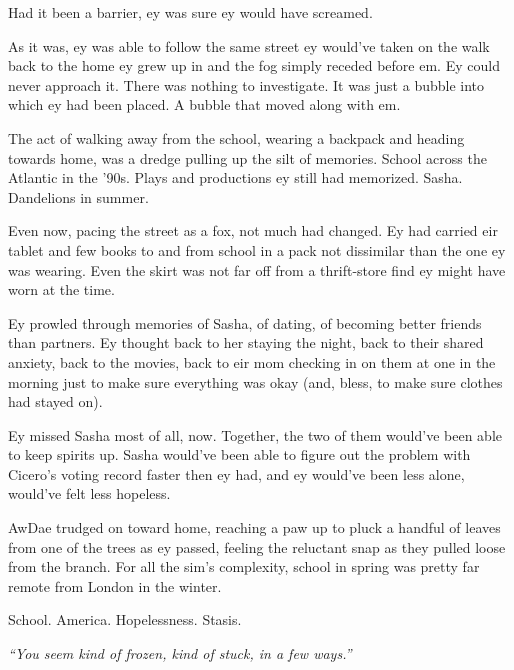 Had it been a barrier, ey was sure ey would have screamed.

As it was, ey was able to follow the same street ey would've taken on the walk back to the home ey grew up in and the fog simply receded before em. Ey could never approach it. There was nothing to investigate. It was just a bubble into which ey had been placed. A bubble that moved along with em.

The act of walking away from the school, wearing a backpack and heading towards home, was a dredge pulling up the silt of memories. School across the Atlantic in the '90s. Plays and productions ey still had memorized. Sasha. Dandelions in summer.

Even now, pacing the street as a fox, not much had changed. Ey had carried eir tablet and few books to and from school in a pack not dissimilar than the one ey was wearing. Even the skirt was not far off from a thrift-store find ey might have worn at the time.

Ey prowled through memories of Sasha, of dating, of becoming better friends than partners. Ey thought back to her staying the night, back to their shared anxiety, back to the movies, back to eir mom checking in on them at one in the morning just to make sure everything was okay (and, bless, to make sure clothes had stayed on).

Ey missed Sasha most of all, now. Together, the two of them would've been able to keep spirits up. Sasha would've been able to figure out the problem with Cicero's voting record faster then ey had, and ey would've been less alone, would've felt less hopeless.

AwDae trudged on toward home, reaching a paw up to pluck a handful of leaves from one of the trees as ey passed, feeling the reluctant snap as they pulled loose from the branch. For all the sim's complexity, school in spring was pretty far remote from London in the winter.

School. America. Hopelessness. Stasis.

\emph{``You seem kind of frozen, kind of stuck, in a few ways.''}
